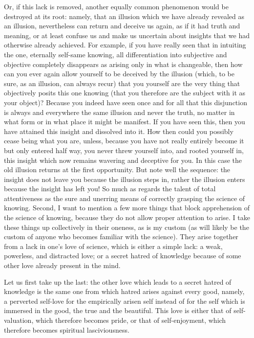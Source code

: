 Or, if this lack is removed,
another equally common phenomenon
would be destroyed at its root:
namely, that an illusion which
we have already revealed as an illusion,
nevertheless can return and deceive us again,
as if it had truth and meaning,
or at least confuse us and make us uncertain
about insights that we had otherwise already achieved.
For example, if you have really seen that
in intuiting the one, eternally self-same knowing,
all differentiation into subjective and objective
completely disappears as arising only in what is changeable,
then how can you ever again allow yourself
to be deceived by the illusion
(which, to be sure, as an illusion, can always recur)
that you yourself are the very thing
that objectively posits this one knowing
(that you therefore are the subject with it as your object)?
Because you indeed have seen once and for all
that this disjunction is always and everywhere the same
illusion and never the truth,
no matter in what form or in what place it might be manifest.
If you have seen this, then you have attained this insight
and dissolved into it.
How then could you possibly cease being what you are, unless,
because you have not really entirely become it
but only entered half way,
you never threw yourself into,
and rooted yourself in,
this insight which now remains
wavering and deceptive for you.
In this case the old illusion returns
at the first opportunity.
But note well the sequence:
the insight does not leave you
because the illusion steps in,
rather the illusion enters
because the insight has left you!
So much as regards the talent of
total attentiveness as the sure and unerring
means of correctly grasping the science of knowing.
Second, I want to mention a few more things
that block apprehension of the science of knowing,
because they do not allow proper attention to arise.
I take these things up collectively in their oneness,
as is my custom (as will likely be the
custom of anyone who becomes familiar with the science).
They arise together from a lack in one's love of science,
which is either a simple lack:
a weak, powerless, and distracted love;
or a secret hatred of knowledge because of
some other love already present in the mind.

Let us first take up the last:
the other love which leads
to a secret hatred of knowledge is
the same one from which hatred
arises against every good,
namely, a perverted self-love
for the empirically arisen self
instead of for the self which is immersed
in the good, the true and the beautiful.
This love is either that of self-valuation,
which therefore becomes pride,
or that of self-enjoyment,
which therefore becomes spiritual lasciviousness.

